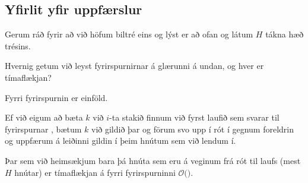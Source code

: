 \subsection{Yfirlit yfir uppfærslur}
{
	{
		\item<1-> Gerum ráð fyrir að við höfum biltré eins og lýst er að ofan og látum $H$ tákna hæð trésins.
		\item<2-> Hvernig getum við leyst fyrirspurnirnar á glærunni á undan, og hver er tímaflækjan?
		\item<3-> Fyrri fyrirspurnin er einföld.
		\item<4-> Ef við eigum að bæta $k$ við $i$-ta stakið finnum við fyrst laufið sem svarar til fyrirspurnar ,
					bætum $k$ við gildið þar og förum svo upp í rót í gegnum foreldrin og uppfærum á leiðinni gildin í þeim hnútum sem við lendum í.
		\item<5-> Þar sem við heimsækjum bara þá hnúta sem eru á veginum frá rót til laufs (mest $H$ hnútar)
					er tímaflækjan á fyrri fyrirspurninni $\mathcal{O}($\onslide<6->{$\,H\,$}$)$.
	}
}


